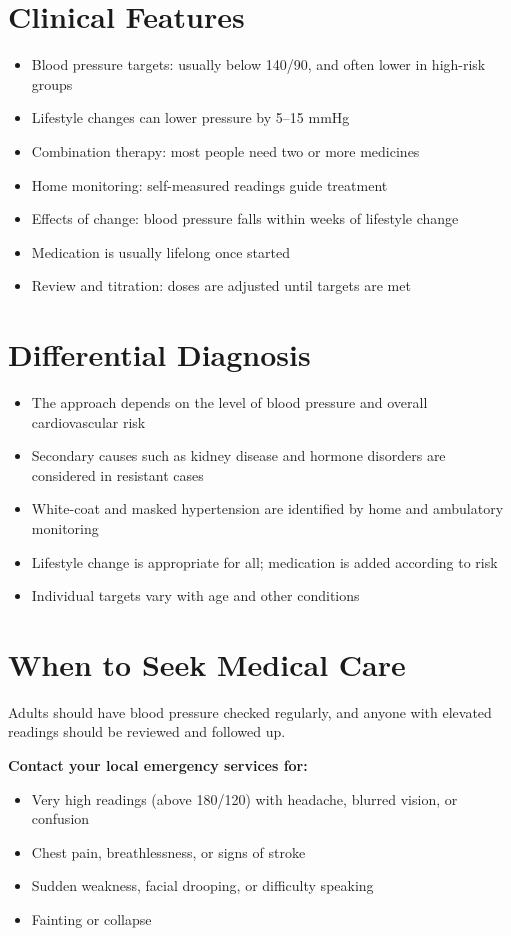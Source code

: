 \section*{Clinical Features}
\begin{itemize}
    \item Blood pressure targets: usually below 140/90, and often lower in high-risk groups
    \item Lifestyle changes can lower pressure by 5--15 mmHg
    \item Combination therapy: most people need two or more medicines
    \item Home monitoring: self-measured readings guide treatment
    \item Effects of change: blood pressure falls within weeks of lifestyle change
    \item Medication is usually lifelong once started
    \item Review and titration: doses are adjusted until targets are met
\end{itemize}

\section*{Differential Diagnosis}
\begin{itemize}
    \item The approach depends on the level of blood pressure and overall cardiovascular risk
    \item Secondary causes such as kidney disease and hormone disorders are considered in resistant cases
    \item White-coat and masked hypertension are identified by home and ambulatory monitoring
    \item Lifestyle change is appropriate for all; medication is added according to risk
    \item Individual targets vary with age and other conditions
\end{itemize}

\section*{When to Seek Medical Care}
Adults should have blood pressure checked regularly, and anyone with elevated readings should be reviewed and followed up.

\textbf{Contact your local emergency services for:}
\begin{itemize}
    \item Very high readings (above 180/120) with headache, blurred vision, or confusion
    \item Chest pain, breathlessness, or signs of stroke
    \item Sudden weakness, facial drooping, or difficulty speaking
    \item Fainting or collapse
\end{itemize}

